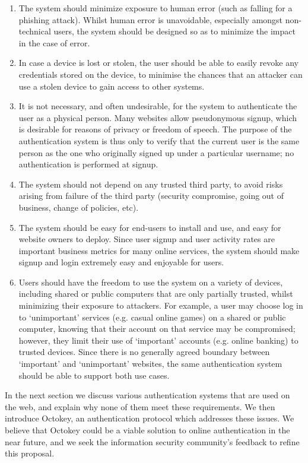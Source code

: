 \begin{enumerate}
\item The system should minimize exposure to human error (such as falling for a phishing attack).
Whilst human error is unavoidable, especially amongst non-technical users, the system should be
designed so as to minimize the impact in the case of error.
\item In case a device is lost or stolen, the user should be able to easily revoke any credentials
stored on the device, to minimise the chances that an attacker can use a stolen device to gain
access to other systems.
\item It is not necessary, and often undesirable, for the system to authenticate the user as a
physical person. Many websites allow pseudonymous signup, which is desirable for reasons of privacy
or freedom of speech. The purpose of the authentication system is thus only to verify that the
current user is the same person as the one who originally signed up under a particular username; no
authentication is performed at signup.
\item The system should not depend on any trusted third party, to avoid risks arising from failure
of the third party (security compromise, going out of business, change of policies, etc).
\item The system should be easy for end-users to install and use, and easy for website owners to
deploy. Since user signup and user activity rates are important business metrics for many online
services, the system should make signup and login extremely easy and enjoyable for users.
\item Users should have the freedom to use the system on a variety of devices, including shared or
public computers that are only partially trusted, whilst minimizing their exposure to attackers.
For example, a user may choose log in to `unimportant' services (e.g. casual online games) on a
shared or public computer, knowing that their account on that service may be compromised; however,
they limit their use of `important' accounts (e.g. online banking) to trusted devices. Since there
is no generally agreed boundary between `important' and `unimportant' websites, the same
authentication system should be able to support both use cases.
\end{enumerate}

In the next section we discuss various authentication systems that are used on the web, and explain
why none of them meet these requirements. We then introduce Octokey, an authentication protocol
which addresses these issues. We believe that Octokey could be a viable solution to online
authentication in the near future, and we seek the information security community's feedback to
refine this proposal.

